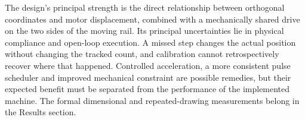 The design's principal strength is the direct relationship between orthogonal coordinates and motor displacement, combined with a mechanically shared drive on the two sides of the moving rail. Its principal uncertainties lie in physical compliance and open-loop execution. A missed step changes the actual position without changing the tracked count, and calibration cannot retrospectively recover where that happened. Controlled acceleration, a more consistent pulse scheduler and improved mechanical constraint are possible remedies, but their expected benefit must be separated from the performance of the implemented machine. The formal dimensional and repeated-drawing measurements belong in the Results section.
\FloatBarrier
